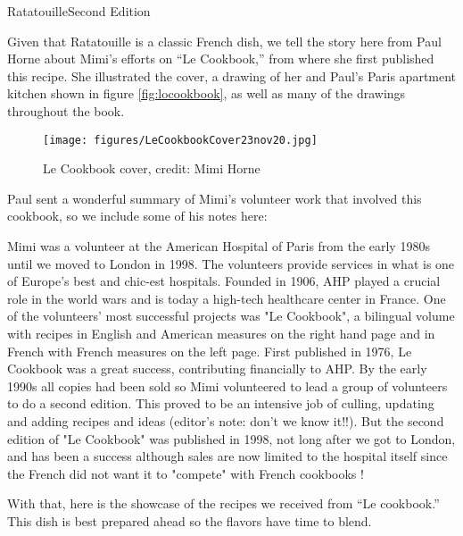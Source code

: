 \begin{entry}{Ratatouille}{Second Edition}
\label{sec:lecookbook}

\begin{open}
Given that Ratatouille is a classic French dish, we tell the story here from Paul Horne about Mimi's efforts on ``Le Cookbook,'' from where she first published this recipe. She illustrated the cover, a drawing of her and Paul's Paris apartment kitchen shown in figure \ref{fig:locookbook}, as well as many of the drawings throughout the book. 

\begin{figure}
  \centering
  \texttt{[image: figures/LeCookbookCover23nov20.jpg]}
  \caption{Le Cookbook cover, credit: Mimi Horne}
  \label{fig:pork-candy-prep}
\end{figure}

Paul sent a wonderful summary of Mimi's volunteer work that involved this cookbook, so we include some of his notes here:

Mimi was a volunteer at the American Hospital of Paris from the early 1980s until we moved to London in 1998. The volunteers
provide services in what is one of Europe's best and chic-est hospitals. Founded in 1906, AHP played a crucial role in the world wars and is today a high-tech healthcare center in France. One of the volunteers' most successful projects was "Le Cookbook", a bilingual volume with recipes in English and American measures on the right hand page and in French with French measures on the left page. First published in 1976, Le Cookbook was a great success, contributing financially to AHP. By the early 1990s all copies had been sold so Mimi volunteered to lead a group of volunteers to do a second edition. This proved to be an intensive job of culling, updating and adding recipes and ideas (editor's note: don't we know it!!). But the second edition of "Le Cookbook" was published in 1998, not long after we got to London, and has been a success although sales are now limited to the hospital itself since the French did not want it to "compete" with French cookbooks !

With that, here is the showcase of the recipes we received from ``Le cookbook.'' This dish is best prepared ahead so the flavors have time to blend. 


\end{open}
\end{entry}
